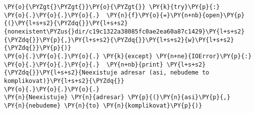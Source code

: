 \begin{Verbatim}[commandchars=\\\{\}]
\PY{o}{\PYZgt{}\PYZgt{}}\PY{o}{\PYZgt{}} \PY{k}{try}\PY{p}{:}
\PY{o}{.}\PY{o}{.}\PY{o}{.}  \PY{n}{f}\PY{o}{=}\PY{n+nb}{open}\PY{p}{(}\PY{l+s+s2}{\PYZdq{}}\PY{l+s+s2}{nonexistent\PYZus{}dir/c19c1322a38085fc0ae2ea60a87c1429}\PY{l+s+s2}{\PYZdq{}}\PY{p}{,}\PY{l+s+s2}{\PYZdq{}}\PY{l+s+s2}{w}\PY{l+s+s2}{\PYZdq{}}\PY{p}{)}
\PY{o}{.}\PY{o}{.}\PY{o}{.} \PY{k}{except} \PY{n+ne}{IOError}\PY{p}{:}
\PY{o}{.}\PY{o}{.}\PY{o}{.}  \PY{n+nb}{print} \PY{l+s+s2}{\PYZdq{}}\PY{l+s+s2}{Neexistuje adresar (asi, nebudeme to komplikovat)}\PY{l+s+s2}{\PYZdq{}}
\PY{o}{.}\PY{o}{.}\PY{o}{.} 
\PY{n}{Neexistuje} \PY{n}{adresar} \PY{p}{(}\PY{n}{asi}\PY{p}{,} \PY{n}{nebudeme} \PY{n}{to} \PY{n}{komplikovat}\PY{p}{)}
\end{Verbatim}
